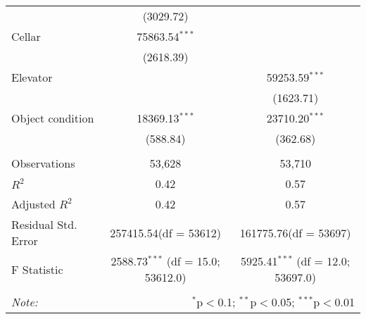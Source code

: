 \begin{table}[!htbp]
\begin{tabular}{@{\extracolsep{5pt}}lcc}
  & (3029.72) & \\
 Cellar & 75863.54$^{***}$ & \\
  & (2618.39) & \\
 Elevator & & 59253.59$^{***}$ \\
  & & (1623.71) \\
 Object condition & 18369.13$^{***}$ & 23710.20$^{***}$ \\
  & (588.84) & (362.68) \\
\hline \\[-1.8ex]
 Observations & 53,628 & 53,710 \\
 $R^2$ & 0.42 & 0.57 \\
 Adjusted $R^2$ & 0.42 & 0.57 \\
 Residual Std. Error & 257415.54(df = 53612) & 161775.76(df = 53697)  \\
 F Statistic & 2588.73$^{***}$ (df = 15.0; 53612.0) & 5925.41$^{***}$ (df = 12.0; 53697.0) \\
\hline
\hline \\[-1.8ex]
\textit{Note:} & \multicolumn{2}{r}{$^{*}$p$<$0.1; $^{**}$p$<$0.05; $^{***}$p$<$0.01} \\
\end{tabular}
\end{table}